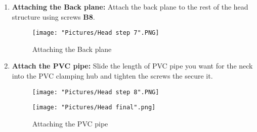 \documentclass[12pt]{article}
\begin{document}
\begin{enumerate}
	\item \textbf{Attaching the Back plane:} Attach the back plane to the rest of the head structure using screws \textbf{B8}.

\begin{figure}[H]
	\centering
	\texttt{[image: "Pictures/Head step 7".PNG]}
	\caption{Attaching the Back plane}
\end{figure}

	\item \textbf{Attach the PVC pipe:} Slide the length of PVC pipe you want for the neck into the PVC clamping hub and tighten the screws the secure it.

\begin{figure}[H]
	\centering
  	\begin{minipage}[b]{0.45\textwidth}
		\texttt{[image: "Pictures/Head step 8".PNG]}
  	\end{minipage}
  	\hfill
  	\begin{minipage}[b]{0.45\textwidth}
    		\texttt{[image: "Pictures/Head final".png]}
  	\end{minipage}
  	\caption{Attaching the PVC pipe}
  	\label{pvc}
\end{figure}

\end{enumerate}
\end{document}
